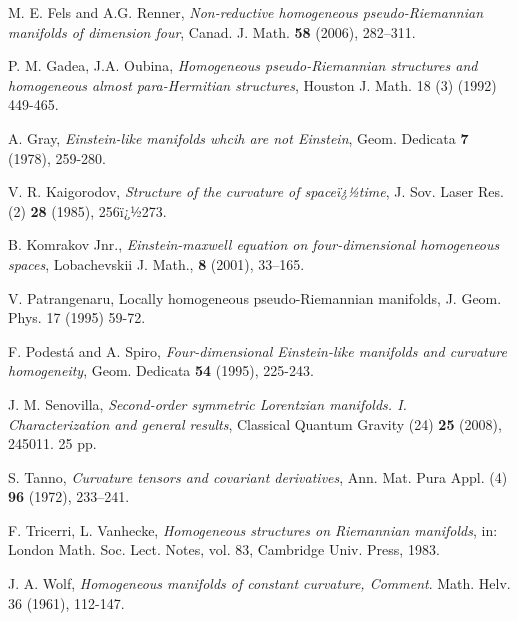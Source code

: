 \documentclass[11pt,oneside,leqno]{amsart}
\theoremstyle{plain}
\begin{document}
\begin{thebibliography}{99}
M. E. Fels and A.G. Renner,  {\em Non-reductive homogeneous pseudo-Riemannian manifolds of dimension four}, Canad. J. Math. {\bf 58} (2006), 282--311.

P. M. Gadea, J.A. Oubina, {\em Homogeneous pseudo-Riemannian structures and homogeneous almost para-Hermitian structures}, Houston J. Math.
18 (3) (1992) 449-465.

A. Gray, {\em Einstein-like manifolds whcih are not Einstein}, Geom. Dedicata {\bf 7} (1978), 259-280.

V. R. Kaigorodov, {\em Structure of the curvature of spaceï¿½time}, J. Sov. Laser Res. (2) {\bf 28} (1985), 256ï¿½273.

B. Komrakov Jnr., {\em Einstein-maxwell equation on four-dimensional homogeneous spaces}, Lobachevskii J. Math., {\bf 8} (2001), 33--165.

V. Patrangenaru, Locally homogeneous pseudo-Riemannian manifolds, J. Geom. Phys. 17 (1995) 59-72.

F. Podest{\'a} and A. Spiro, \emph{Four-dimensional Einstein-like manifolds and curvature homogeneity}, Geom. Dedicata {\bf 54} (1995), 225-243.

J. M. Senovilla, {\em Second-order symmetric Lorentzian manifolds. I. Characterization and general results}, Classical Quantum Gravity (24) {\bf 25} (2008),
245011. 25 pp.

S. Tanno, {\em Curvature tensors and covariant derivatives}, Ann. Mat. Pura Appl. (4) {\bf 96} (1972), 233--241.

F. Tricerri, L. Vanhecke, {\em Homogeneous structures on Riemannian manifolds}, in: London Math. Soc. Lect. Notes, vol. 83, Cambridge Univ. Press, 1983.

 J. A. Wolf, {\em Homogeneous manifolds of constant curvature, Comment}. Math. Helv. 36 (1961), 112-147.

\end{thebibliography}
\end{document}
